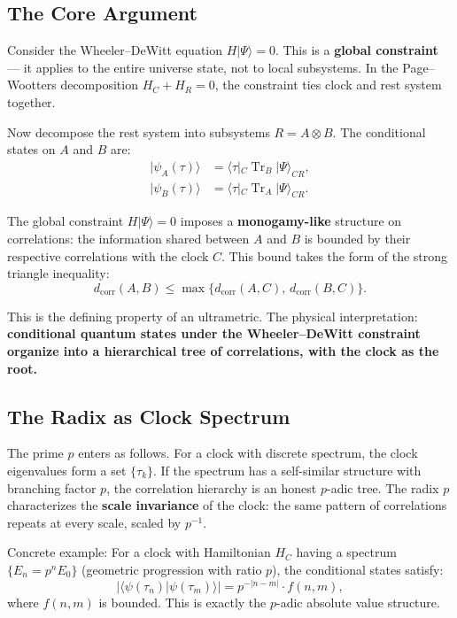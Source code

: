 \documentclass[12pt,a4paper]{article}
\theoremstyle{definition}
\newcommand{\Tr}{\operatorname{Tr}}
\newcommand{\abs}[1]{\lvert#1\rvert}
\newcommand{\ket}[1]{|#1\rangle}
\newcommand{\bra}[1]{\langle #1|}
\newcommand{\braket}[2]{\langle #1 | #2 \rangle}
\begin{document}
\subsection{The Core Argument}

Consider the Wheeler--DeWitt equation $H\ket{\Psi} = 0$. This is a \textbf{global constraint} --- it applies to the entire universe state, not to local subsystems. In the Page--Wootters decomposition $H_C + H_R = 0$, the constraint ties clock and rest system together.

Now decompose the rest system into subsystems $R = A \otimes B$. The conditional states on $A$ and $B$ are:
\begin{align}
\ket{\psi_A(\tau)} &= \bra{\tau}_C \Tr_B \ket{\Psi}_{CR}, \\
\ket{\psi_B(\tau)} &= \bra{\tau}_C \Tr_A \ket{\Psi}_{CR}.
\end{align}

The global constraint $H\ket{\Psi}=0$ imposes a \textbf{monogamy-like} structure on correlations: the information shared between $A$ and $B$ is bounded by their respective correlations with the clock $C$. This bound takes the form of the strong triangle inequality:
\begin{equation}
d_{\text{corr}}(A,B) \le \max\{d_{\text{corr}}(A,C),\, d_{\text{corr}}(B,C)\}.
\end{equation}

This is the defining property of an ultrametric. The physical interpretation: \textbf{conditional quantum states under the Wheeler--DeWitt constraint organize into a hierarchical tree of correlations, with the clock as the root.}

\subsection{The Radix as Clock Spectrum}

The prime $p$ enters as follows. For a clock with discrete spectrum, the clock eigenvalues form a set $\{\tau_k\}$. If the spectrum has a self-similar structure with branching factor $p$, the correlation hierarchy is an honest $p$-adic tree. The radix $p$ characterizes the \textbf{scale invariance} of the clock: the same pattern of correlations repeats at every scale, scaled by $p^{-1}$.

Concrete example: For a clock with Hamiltonian $H_C$ having a spectrum $\{E_n = p^n E_0\}$ (geometric progression with ratio $p$), the conditional states satisfy:
\begin{equation}
\abs{\braket{\psi(\tau_n)}{\psi(\tau_m)}} = p^{-\abs{n-m}} \cdot f(n,m),
\end{equation}
where $f(n,m)$ is bounded. This is exactly the $p$-adic absolute value structure.
\end{document}
